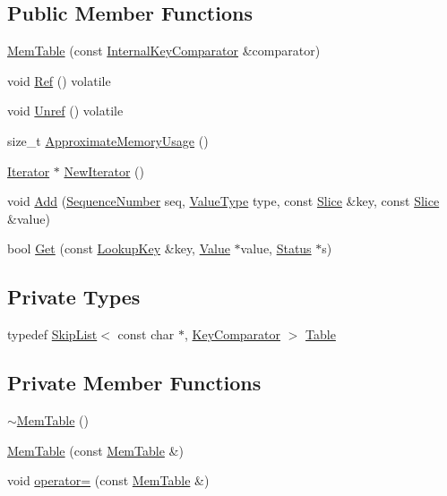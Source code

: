 \subsection*{Public Member Functions}
\begin{DoxyCompactItemize}
\item 
\hyperlink{classleveldb_1_1_mem_table_a23add92a4a6e5d1521f3b6695dba5c2d}{Mem\+Table} (const \hyperlink{classleveldb_1_1_internal_key_comparator}{Internal\+Key\+Comparator} \&comparator)
\item 
void \hyperlink{classleveldb_1_1_mem_table_ac682e4603a8a5583bd58196b1e5c49b5}{Ref} () volatile
\item 
void \hyperlink{classleveldb_1_1_mem_table_a2cd9b02f19fa14f5584adc2c13eeb922}{Unref} () volatile
\item 
size\+\_\+t \hyperlink{classleveldb_1_1_mem_table_a667a1ada274201f0bdd3615baf1bd882}{Approximate\+Memory\+Usage} ()
\item 
\hyperlink{classleveldb_1_1_iterator}{Iterator} $\ast$ \hyperlink{classleveldb_1_1_mem_table_a396b8ba5e2ea0de25b666026f3b9235f}{New\+Iterator} ()
\item 
void \hyperlink{classleveldb_1_1_mem_table_a37bec80954badb2354426aa175e9371f}{Add} (\hyperlink{namespaceleveldb_a5481ededd221c36d652c371249f869fa}{Sequence\+Number} seq, \hyperlink{namespaceleveldb_acc038cb0d608414730cafa459a4ba866}{Value\+Type} type, const \hyperlink{classleveldb_1_1_slice}{Slice} \&key, const \hyperlink{classleveldb_1_1_slice}{Slice} \&value)
\item 
bool \hyperlink{classleveldb_1_1_mem_table_a2cfc04ca0c4ea33bbd269857682dabbb}{Get} (const \hyperlink{classleveldb_1_1_lookup_key}{Lookup\+Key} \&key, \hyperlink{classleveldb_1_1_value}{Value} $\ast$value, \hyperlink{classleveldb_1_1_status}{Status} $\ast$s)
\end{DoxyCompactItemize}
\subsection*{Private Types}
\begin{DoxyCompactItemize}
\item 
typedef \hyperlink{classleveldb_1_1_skip_list}{Skip\+List}$<$ const char $\ast$, \hyperlink{structleveldb_1_1_mem_table_1_1_key_comparator}{Key\+Comparator} $>$ \hyperlink{classleveldb_1_1_mem_table_af42bc32bc4c20aea12fc647ee41df058}{Table}
\end{DoxyCompactItemize}
\subsection*{Private Member Functions}
\begin{DoxyCompactItemize}
\item 
\hyperlink{classleveldb_1_1_mem_table_a5d61fe1bfd5265b3f6978495e9bbfeb0}{$\sim$\+Mem\+Table} ()
\item 
\hyperlink{classleveldb_1_1_mem_table_affbcb1af721f7f96cb944e6bef88480a}{Mem\+Table} (const \hyperlink{classleveldb_1_1_mem_table}{Mem\+Table} \&)
\item 
void \hyperlink{classleveldb_1_1_mem_table_a24726c634ae97afb9af73a0c422e567d}{operator=} (const \hyperlink{classleveldb_1_1_mem_table}{Mem\+Table} \&)
\end{DoxyCompactItemize}
